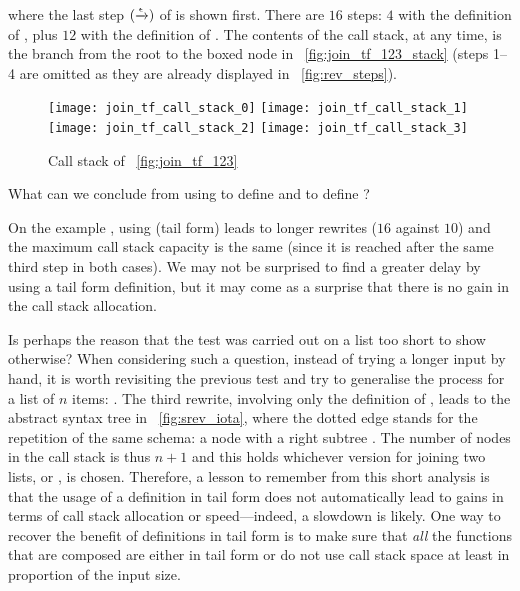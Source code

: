 where the last step \((\xrightarrow{\smash{\epsilon}})\) of
 is shown first. There are \(16\) steps: \(4\)
with the definition of , plus \(12\) with the
definition of . The contents of the call stack, at any
time, is the branch from the root to the boxed node in
\fig~\vref{fig:join_tf_123_stack} (steps 1--4 are omitted as they are
already displayed in \fig~\vref{fig:rev_steps}).
\begin{figure}
\centering
\texttt{[image: join\_tf\_call\_stack\_0]}
\bigskip
\texttt{[image: join\_tf\_call\_stack\_1]}
\bigskip
\texttt{[image: join\_tf\_call\_stack\_2]}
\bigskip
\texttt{[image: join\_tf\_call\_stack\_3]}
\caption{Call stack of \protect\fig~\protect\vref{fig:join_tf_123}
\label{fig:join_tf_123_stack}}
\end{figure}

What can we conclude from using  to define
 and  to define
?

On the example , using
 (tail form) leads to longer rewrites (\(16\)
against \(10\)) and the maximum call stack capacity is the same (since
it is reached after the same third step in both cases). We may not be
surprised to find a greater delay by using a tail form definition, but
it may come as a surprise that there is no gain in the call stack
allocation.

Is perhaps the reason that the test was carried out on a list too
short to show otherwise? When considering such a question, instead of
trying a longer input by hand, it is worth revisiting the previous
test and try to generalise the process for a list of \(n\) items:
\erlcode{[\(I_0\),\(\dots\),\(I_{n-1}\)]}. The third rewrite,
involving only the definition of , leads to the
abstract syntax tree in \fig~\vref{fig:srev_iota}, where the dotted
edge stands for the repetition of the same schema: a node
 with a right subtree \erlcode{[\(I_i\)]}. The number of
nodes in the call stack is thus \(n+1\) and this holds whichever
version for joining two lists,  or
, is chosen. Therefore, a lesson to remember from
this short analysis is that the usage of a definition in tail form
does not automatically lead to gains in terms of call stack allocation
or speed---indeed, a slowdown is likely. One way to recover the
benefit of definitions in tail form is to make sure that \emph{all}
the functions that are composed are either in tail form or do not use
call stack space at least in proportion of the input size.

